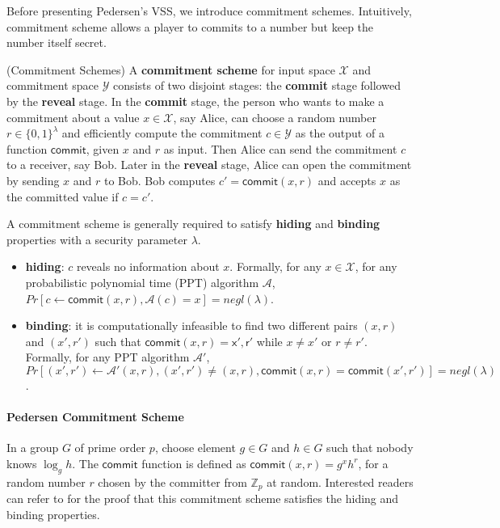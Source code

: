 Before presenting Pedersen's VSS, we introduce commitment schemes. Intuitively, commitment scheme allows a player to commits to a number but keep the number itself secret. 

\begin{definition}{(Commitment Schemes)}
    A \textbf{commitment scheme} for input space $\mathcal{X}$ and commitment space $\mathcal{Y}$ consists of two disjoint stages: the \textbf{commit} stage followed by the \textbf{reveal} stage. In the \textbf{commit} stage, the person who wants to make a commitment about a value $x\in\mathcal{X}$, say Alice, can choose a random number $r\in\{0,1\}^\lambda$ and efficiently compute the commitment $c\in\mathcal{Y}$ as the output of a function $\mathsf{commit}$, given $x$ and $r$ as input. Then Alice can send the commitment $c$ to a receiver, say Bob. Later in the \textbf{reveal} stage, Alice can open the commitment by sending $x$ and $r$ to Bob. Bob computes $c'=\mathsf{commit}(x,r)$ and accepts $x$ as the committed value if $c=c'$. 
\end{definition}

A commitment scheme is generally required to satisfy \textbf{hiding} and \textbf{binding} properties with a security parameter $\lambda$. 

\begin{itemize}
    \item \textbf{hiding}: $c$ reveals no information about $x$. Formally, for any $x\in \mathcal{X}$, for any probabilistic polynomial time (PPT) algorithm $\mathcal{A}$, $Pr[c\leftarrow \mathsf{commit}(x, r), \mathcal{A}(c)=x]=negl(\lambda)$. 
    \item \textbf{binding}: it is computationally infeasible to find two different pairs $(x,r)$ and $(x', r')$ such that $\mathsf{commit}(x, r)=\mathsf{x', r'}$ while $x\neq x'$ or $r\neq r'$. Formally, for any PPT algorithm $\mathcal{A}'$, $Pr[(x', r')\leftarrow \mathcal{A}'(x, r), (x',r')\neq (x,r), \mathsf{commit}(x,r)=\mathsf{commit}(x',r')]=negl(\lambda)$. 
\end{itemize}

\paragraph{Pedersen Commitment Scheme} In a group $G$ of prime order $p$, choose element $g\in G$ and $h\in G$ such that nobody knows $\log_g h$. The $\mathsf{commit}$ function is defined as $\mathsf{commit}(x,r) = g^x h^r$, for a random number $r$ chosen by the committer from $\mathbb{Z}_p$ at random. Interested readers can refer to \cite{DBLP:conf/crypto/Pedersen91} for the proof that this commitment scheme satisfies the hiding and binding properties. 

